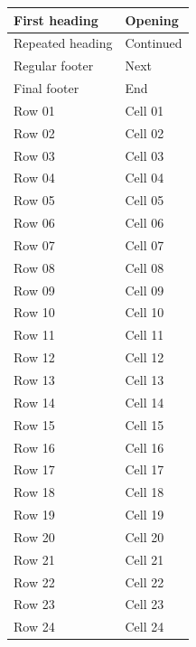 \documentclass{article}\usepackage[paperheight=55mm,paperwidth=110mm,margin=10mm]{geometry}\usepackage{longtable}
\begin{document}
\begin{longtable}{ll}
First heading & Opening \\
\endfirsthead
Repeated heading & Continued \\
\endhead
Regular footer & Next \\
\endfoot
Final footer & End \\
\endlastfoot
Row 01 & Cell 01 \\
Row 02 & Cell 02 \\
Row 03 & Cell 03 \\
Row 04 & Cell 04 \\
Row 05 & Cell 05 \\
Row 06 & Cell 06 \\
Row 07 & Cell 07 \\
Row 08 & Cell 08 \\
Row 09 & Cell 09 \\
Row 10 & Cell 10 \\
Row 11 & Cell 11 \\
Row 12 & Cell 12 \\
Row 13 & Cell 13 \\
Row 14 & Cell 14 \\
Row 15 & Cell 15 \\
Row 16 & Cell 16 \\
Row 17 & Cell 17 \\
Row 18 & Cell 18 \\
Row 19 & Cell 19 \\
Row 20 & Cell 20 \\
Row 21 & Cell 21 \\
Row 22 & Cell 22 \\
Row 23 & Cell 23 \\
Row 24 & Cell 24 \\
\end{longtable}
\end{document}
